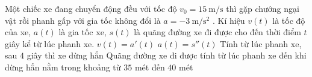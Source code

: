 \begin{ex}%
	Một chiếc xe đang chuyển động đều với tốc độ ${v_0}=15~\mathrm{m/s}$ thì gặp chướng ngại vật rồi phanh gấp với  gia tốc không đổi là $a=-3~\mathrm{m/s^2} $ . Kí hiệu $v(t)$ là tốc độ của xe, $a(t)$ là gia tốc xe, $s(t)$ là quãng đường xe đi được cho đến thời điểm $t$ giây kể từ lúc phanh xe.
	\choiceTF 
		{$v(t)=a'(t)$} 
		{\True $a(t)=s''(t)$} 
		{Tính từ lúc phanh xe, sau  $4$ giây thì xe dừng hẳn}
		{\True Quãng đường xe đi được tính từ lúc phanh xe  đến khi dừng hẳn nằm trong khoảng từ $35$ mét đến $40$ mét}
\end{ex}

